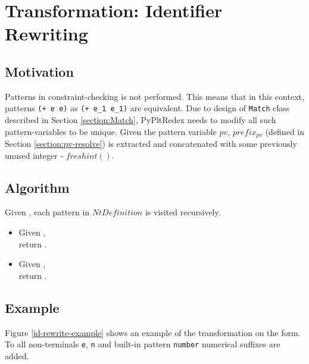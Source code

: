 \section{Transformation: Identifier Rewriting}
\label{section:id-rewrite}

\subsection{Motivation}

Patterns in \DefineLanguageNoArg constraint-checking is not performed. This means that in this context, patterns \texttt{(+ e e)} as \texttt{(+ e\_1 e\_1)} are equivalent. Due to design of \texttt{Match} class described in Section \ref{section:Match}, PyPltRedex needs to modify all such pattern-variables to be unique. Given the pattern variable $pv$, $prefix_{pv}$ (defined in Section \ref{section:pv-resolve}) is extracted and concatenated with some previously unused integer - $freshint()$.

\subsection{Algorithm}
Given , each pattern in $NtDefinition$ is visited recursively.
\begin{itemize}
\item Given \BuiltInPattern, \\ return .
\item Given \NonTerminal, \\ return .
\end{itemize}

\subsection{Example}

Figure \ref{id-rewrite-example} shows an example of the transformation on the \DefineLanguage form. To all non-terminals \texttt{e}, \texttt{n} and built-in pattern \texttt{number} numerical suffixes are added.

